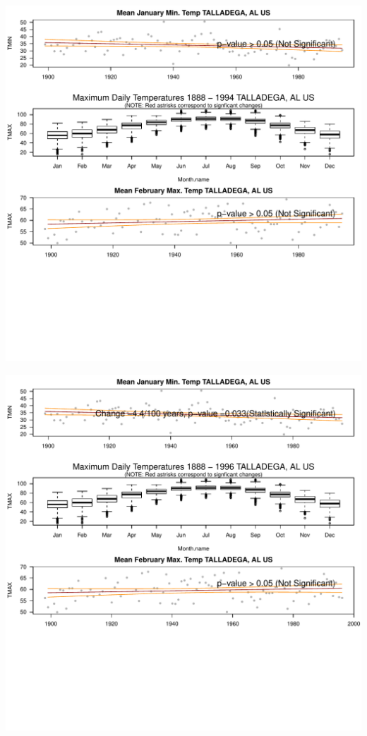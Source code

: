\documentclass{article}\usepackage[]{graphicx}\usepackage[]{color}
\makeatletter
\def\maxwidth{ %
  \ifdim\Gin@nat@width>\linewidth
    \linewidth
  \else
    \Gin@nat@width
  \fi
}
\newenvironment{knitrout}{}{} %
\makeatother
\begin{document}
\begin{knitrout}
\includegraphics[width=\maxwidth]{figure/static_template-43} 

\includegraphics[width=\maxwidth]{figure/static_template-44} 


\end{knitrout}
\end{document}
